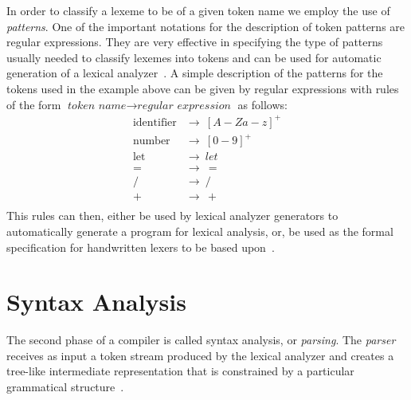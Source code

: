 \documentclass[
  oneside,
  english,
  coorientadorbanca,
  embeddedlogo,
  noabntexcite
]{ufsc-thesis-rn46-2019}
\begin{document}
In order to classify a lexeme to be of a given token name we employ the use of \textit{patterns}.
One of the important notations for the description of token patterns are regular expressions.
They are very effective in specifying the type of patterns usually needed to classify lexemes into tokens and can be used for automatic generation of a lexical analyzer~\cite{Aho:2006:CPT:1177220}.
A simple description of the patterns for the tokens used in the example above can be given by regular expressions with rules of the form $\textit{token name} \rightarrow \textit{regular expression}$ as follows:
\begin{equation*}
  \begin{aligned}
    \textrm{identifier} & \rightarrow \ {[A-Za-z]}^+ \\
    \textrm{number}     & \rightarrow \ {[0-9]}^+    \\
    \textrm{let}        & \rightarrow \ let          \\
    =                   & \rightarrow \  =           \\
    /                   & \rightarrow \ /            \\
    +                   & \rightarrow \ +            \\
  \end{aligned}
\end{equation*}
This rules can then, either be used by lexical analyzer generators to automatically generate a program for lexical analysis, or, be used as the formal specification for handwritten lexers to be based upon~\cite{Aho:2006:CPT:1177220}.

\section{Syntax Analysis}\label{chapter:background:sec:syntax}

The second phase of a compiler is called syntax analysis, or \textit{parsing}.
The \textit{parser} receives as input a token stream produced by the lexical analyzer and creates a tree-like intermediate representation that is constrained by a particular grammatical structure~\cite{Aho:2006:CPT:1177220}.
\end{document}
